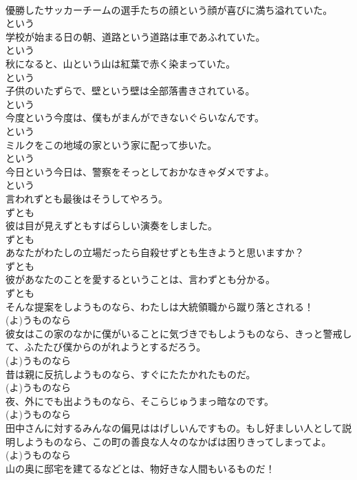 \documentclass[8pt]{extreport}
\begin{document}
\begin{CJK}{UTF8}{min}
\\	優勝したサッカーチームの選手たちの顔という顔が喜びに満ち溢れていた。	
\\	という
\\	学校が始まる日の朝、道路という道路は車であふれていた。	
\\	という
\\	秋になると、山という山は紅葉で赤く染まっていた。	
\\	という
\\	子供のいたずらで、壁という壁は全部落書きされている。	
\\	という
\\	今度という今度は、僕もがまんができないぐらいなんです。	
\\	という
\\	ミルクをこの地域の家という家に配って歩いた。	
\\	という
\\	今日という今日は、警察をそっとしておかなきゃダメですよ。	
\\	という
\\	言われずとも最後はそうしてやろう。	
\\	ずとも
\\	彼は目が見えずともすばらしい演奏をしました。	
\\	ずとも
\\	あなたがわたしの立場だったら自殺せずとも生きようと思いますか？	
\\	ずとも
\\	彼があなたのことを愛するということは、言わずとも分かる。	
\\	ずとも
\\	そんな提案をしようものなら、わたしは大統領職から蹴り落とされる！	
\\	(よ)うものなら
\\	彼女はこの家のなかに僕がいることに気づきでもしようものなら、きっと警戒して、ふたたび僕からのがれようとするだろう。	
\\	(よ)うものなら
\\	昔は親に反抗しようものなら、すぐにたたかれたものだ。	
\\	(よ)うものなら
\\	夜、外にでも出ようものなら、そこらじゅうまっ暗なのです。	
\\	(よ)うものなら
\\	田中さんに対するみんなの偏見ははげしいんですもの。もし好ましい人として説明しようものなら、この町の善良な人々のなかばは困りきってしまってよ。	
\\	(よ)うものなら
\\	山の奥に邸宅を建てるなどとは、物好きな人間もいるものだ！	

\end{CJK}
\end{document}
